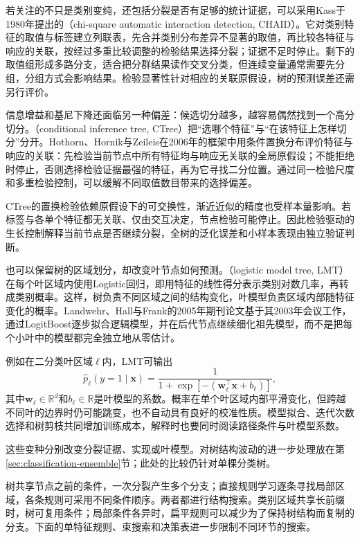 若关注的不只是类别变纯，还包括分裂是否有足够的统计证据，可以采用Kass于1980年提出的（chi-square automatic interaction detection, CHAID）。它对类别特征的取值与标签建立列联表，先合并类别分布差异不显著的取值，再比较各特征与响应的关联，按经过多重比较调整的检验结果选择分裂；证据不足时停止。剩下的取值组形成多路分支，适合把分群结果读作交叉分类，但连续变量通常需要先分组，分组方式会影响结果。检验显著性针对相应的关联原假设，树的预测误差还需另行评价。

信息增益和基尼下降还面临另一种偏差：候选切分越多，越容易偶然找到一个高分切分。（conditional inference tree, CTree）把“选哪个特征”与“在该特征上怎样切分”分开。Hothorn、Hornik与Zeileis在2006年的框架中用条件置换分布评价特征与响应的关联：先检验当前节点中所有特征均与响应无关联的全局原假设；不能拒绝时停止，否则选择检验证据最强的特征，再为它寻找二分位置。通过同一检验尺度和多重检验控制，可以缓解不同取值数目带来的选择偏差。

CTree的置换检验依赖原假设下的可交换性，渐近近似的精度也受样本量影响。若标签与各单个特征都无关联、仅由交互决定，节点检验可能停止。因此检验驱动的生长控制解释当前节点是否继续分裂，全树的泛化误差和小样本表现由独立验证判断。

也可以保留树的区域划分，却改变叶节点如何预测。（logistic model tree, LMT）在每个叶区域内使用Logistic回归，即用特征的线性得分表示类别对数几率，再转成类别概率。这样，树负责不同区域之间的结构变化，叶模型负责区域内部随特征变化的概率。Landwehr、Hall与Frank的2005年期刊论文基于其2003年会议工作，通过LogitBoost逐步拟合逻辑模型，并在后代节点继续细化祖先模型，而不是把每个小叶中的模型都完全独立地从零估计。

例如在二分类叶区域$\ell$内，LMT可输出
\begin{equation}
  \hat p_\ell(y=1\mid\bm{x})
  =\frac{1}{1+\exp[-(\bm{w}_\ell^\top\bm{x}+b_\ell)]},
  \label{eq:classification-lmt-leaf}
\end{equation}
其中$\bm{w}_\ell\in\mathbb{R}^d$和$b_\ell\in\mathbb{R}$是叶模型的系数。概率在单个叶区域内部平滑变化，但跨越不同叶的边界时仍可能跳变，也不自动具有良好的校准性质。模型拟合、迭代次数选择和树剪枝共同增加训练成本，解释时也要同时阅读路径条件与叶模型系数。

这些变种分别改变分裂证据、实现或叶模型。对树结构波动的进一步处理放在第\ref{sec:classification-ensemble}节；此处的比较仍针对单棵分类树。

树共享节点之前的条件，一次分裂产生多个分支；直接规则学习逐条寻找局部区域，各条规则可采用不同条件顺序。两者都进行结构搜索。类别区域共享长前缀时，树可复用条件；局部条件各异时，扁平规则可以减少为了保持树结构而复制的分支。下面的单特征规则、束搜索和决策表进一步限制不同环节的搜索。

